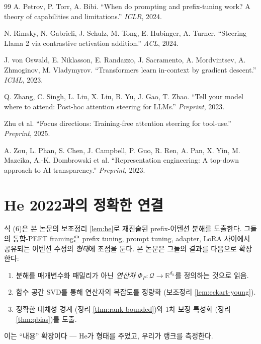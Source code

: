\documentclass{article}
\theoremstyle{definition}
\newcommand{\R}{\mathbb{R}}
\newcommand{\Phip}{\Phi_P}
\newcommand{\dh}{d_h}
\begin{document}
\begin{thebibliography}{99}
A. Petrov, P. Torr, A. Bibi.
``When do prompting and prefix-tuning work? A theory of capabilities and limitations.''
\emph{ICLR}, 2024.

N. Rimsky, N. Gabrieli, J. Schulz, M. Tong, E. Hubinger, A. Turner.
``Steering Llama 2 via contrastive activation addition.''
\emph{ACL}, 2024.

J. von Oswald, E. Niklasson, E. Randazzo, J. Sacramento, A. Mordvintsev, A. Zhmoginov, M. Vladymyrov.
``Transformers learn in-context by gradient descent.''
\emph{ICML}, 2023.

Q. Zhang, C. Singh, L. Liu, X. Liu, B. Yu, J. Gao, T. Zhao.
``Tell your model where to attend: Post-hoc attention steering for LLMs.''
\emph{Preprint}, 2023.

Zhu et al.
``Focus directions: Training-free attention steering for tool-use.''
\emph{Preprint}, 2025.

A. Zou, L. Phan, S. Chen, J. Campbell, P. Guo, R. Ren, A. Pan, X. Yin, M. Mazeika, A.-K. Dombrowski et al.
``Representation engineering: A top-down approach to AI transparency.''
\emph{Preprint}, 2023.

\end{thebibliography}

\appendix

\section{He 2022과의 정확한 연결}
\label{app:he}

\citet{he2022unified} 식 (6)은 본 논문의 보조정리 \ref{lem:he}로 재진술된 prefix-어텐션 분해를 도출한다. 그들의 통합-PEFT framing은 prefix tuning, prompt tuning, adapter, LoRA 사이에서 공유되는 어텐션 수정의 \emph{형태}에 초점을 둔다. 본 논문은 그들의 결과를 다음으로 확장한다:
\begin{enumerate}[leftmargin=*]
\item 분해를 매개변수화 패밀리가 아닌 \emph{연산자} $\Phip : \mathcal{Q} \to \R^{\dh}$를 정의하는 것으로 읽음.
\item 함수 공간 SVD를 통해 연산자의 복잡도를 정량화 (보조정리 \ref{lem:eckart-young}).
\item 정확한 대체성 경계 (정리 \ref{thm:rank-bounded})와 1차 보정 특성화 (정리 \ref{thm:qbias})를 도출.
\end{enumerate}
이는 ``내용'' 확장이다 --- He가 형태를 주었고, 우리가 랭크를 측정한다.
\end{document}
